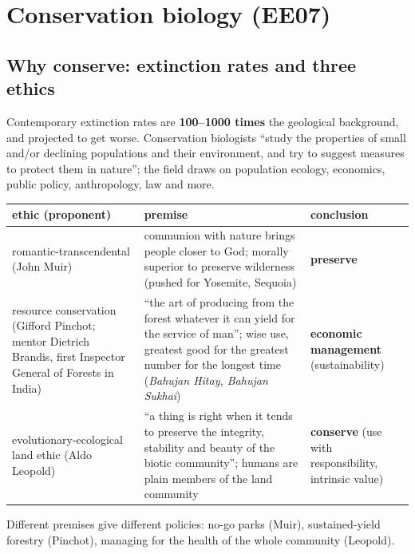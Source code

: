 \section{Conservation biology (EE07)}

\subsection{Why conserve: extinction rates and three ethics}
Contemporary extinction rates are \textbf{100--1000 times} the geological background, and projected to get worse.
Conservation biologists ``study the properties of small and/or declining populations and their environment, and try to
suggest measures to protect them in nature''; the field draws on population ecology, economics, public policy,
anthropology, law and more.

\begin{center}\small
\begin{tabularx}{\textwidth}{>{\raggedright\arraybackslash}p{3.6cm}X>{\raggedright\arraybackslash}p{2.9cm}}
\toprule
ethic (proponent) & premise & conclusion\\\midrule
romantic-transcendental (John Muir) & communion with nature brings people closer to God; morally superior to preserve
wilderness (pushed for Yosemite, Sequoia) & \textbf{preserve}\\
resource conservation (Gifford Pinchot; mentor Dietrich Brandis, first Inspector General of Forests in India) & ``the art
of producing from the forest whatever it can yield for the service of man''; wise use, greatest good for the greatest
number for the longest time (\emph{Bahujan Hitay, Bahujan Sukhai}) & \textbf{economic management} (sustainability)\\
evolutionary-ecological land ethic (Aldo Leopold) & ``a thing is right when it tends to preserve the integrity, stability
and beauty of the biotic community''; humans are plain members of the land community & \textbf{conserve} (use with
responsibility, intrinsic value)\\\bottomrule
\end{tabularx}
\end{center}
Different premises give different policies: no-go parks (Muir), sustained-yield forestry (Pinchot), managing for the
health of the whole community (Leopold).

